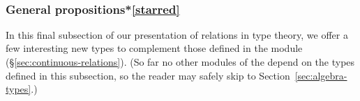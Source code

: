 \begin{code}
\AgdaSpace{}%
\AgdaSymbol{:}\AgdaSpace{}%
\AgdaSymbol{\}}\AgdaSpace{}%
\AgdaSpace{}%
\AgdaSpace{}%
\AgdaSpace{}%
%
\>[36]%
\>[39]\AgdaSpace{}%
\AgdaSpace{}%
\AgdaSpace{}%
\AgdaSpace{}%
\AgdaSpace{}%
\AgdaSpace{}%
\<%
\\
%
%
\>[1]\AgdaSpace{}%
\AgdaSpace{}%
\AgdaSpace{}%
\AgdaSpace{}%
\AgdaSpace{}%
\AgdaSymbol{=}\AgdaSpace{}%
\AgdaSpace{}%
\AgdaSpace{}%
\AgdaSymbol{(}\AgdaSpace{}%
\AgdaSpace{}%
\AgdaSpace{}%
\AgdaSymbol{)}\<%
\end{code}

\subsubsection{General propositions*\protect\cref{starred}}\label{sec:general-props}
In this final subsection of our presentation of relations in type theory, we offer a few interesting new types to complement those defined in the  module (\S\ref{sec:continuous-relations}).  (So far no other modules of the \ualib depend on the types defined in this subsection, so the reader may safely skip to Section~\ref{sec:algebra-types}.) %

